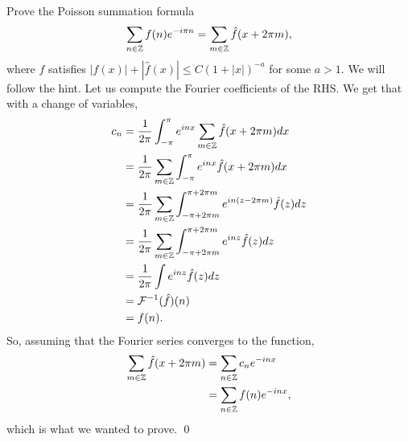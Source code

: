\documentclass{article}
\begin{document}
\newpage
{} Prove the Poisson summation formula
\[\sum_
{n\in\mathbb{Z}}
f(n)e^{-i\pi n} = \sum_
{m\in \mathbb{Z}}\hat{f}(x + 2\pi m),\]
where $f$ satisfies $|f(x)|+ |\hat{f}(x)|\le C(1 + |x|)^{-a}$ for some $a > 1$.  \tri
\hop 
\solution
We will follow the hint. Let us compute the Fourier coefficients of the RHS. We get that with a change of variables,
\begin{align*}
    c_n  &= \frac{1}{2\pi} \int_{-\pi}^\pi e^{inx}\sum_{m \in \mathbb{Z}}\hat{f}(x+2\pi m) dx \\
    &= \frac{1}{2\pi} \sum_{m \in \mathbb{Z}} \int_{-\pi}^\pi e^{inx}\hat{f}(x+2\pi m) dx \\
    &= \frac{1}{2\pi} \sum_{m \in \mathbb{Z}} \int_{-\pi+2\pi m}^{\pi+2\pi m} e^{in(z - 2\pi m)}\hat{f}(z) dz \\
    &= \frac{1}{2\pi} \sum_{m \in \mathbb{Z}} \int_{-\pi+2\pi m}^{\pi+2\pi m} e^{inz}\hat{f}(z) dz \\
    &= \frac{1}{2\pi} \int e^{inz}\hat{f}(z) dz \\
    &= \mathcal{F}{^{-1}}(\hat{f})(n) \\
    &= f(n).
\end{align*}
So, assuming that the Fourier series converges to the function, 
\begin{align*}
    \sum_{m \in \mathbb{Z}}\hat{f}(x+2\pi m) &=  \sum_{n \in \mathbb{Z}}c_ne^{-inx}\\
    &= \sum_{n \in \mathbb{Z}}f(n)e^{-inx},
\end{align*}
which is what we wanted to prove. \qed
\end{document}
